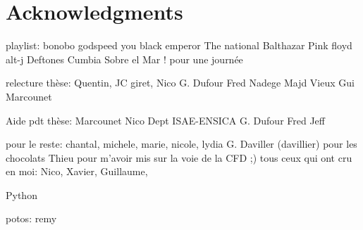 
\chapter*{Acknowledgments}
\thispagestyle{empty}

playlist:
bonobo
godspeed you black emperor
The national
Balthazar
Pink floyd
alt-j
Deftones
Cumbia Sobre el Mar ! pour une journée

relecture thèse:
Quentin,
JC giret,
Nico
G. Dufour
Fred
Nadege
Majd
Vieux Gui
Marcounet

Aide pdt thèse:
Marcounet
Nico
Dept ISAE-ENSICA
G. Dufour
Fred
Jeff

pour le reste:
chantal, michele, marie, nicole, lydia
G. Daviller (davillier) pour les chocolats
Thieu pour m'avoir mis sur la voie de la CFD ;)
tous ceux qui ont cru en moi: Nico, Xavier, Guillaume, 

Python 

potos:
remy